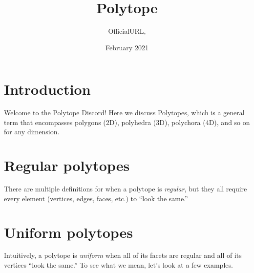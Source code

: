 \documentclass{article}
\title{Polytope}
\author{OfficialURL, }
\date{February 2021}
\begin{document}
\maketitle

\section{Introduction}
Welcome to the Polytope Discord! Here we discuss Polytopes, which is a general term that encompasses polygons (2D), polyhedra (3D), polychora (4D), and so on for any dimension.

\section{Regular polytopes}
There are multiple definitions for when a polytope is \textit{regular}, but they all require every element (vertices, edges, faces, etc.) to ``look the same.''

\section{Uniform polytopes}
Intuitively, a polytope is \textit{uniform} when all of its facets are regular and all of its vertices ``look the same.'' To see what we mean, let's look at a few examples.
\end{document}
